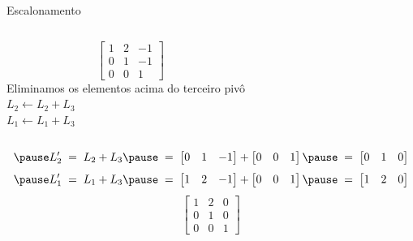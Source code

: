 \begin{resolution}{Escalonamento}
\begin{columns}
  \[\;\;\;
  \begin{bmatrix}
    1 & 2 & -1 \\
    0 & 1 & -1 \\
    0 & 0 & 1
  \end{bmatrix}
  \]
  \pause
{}
  Eliminamos os elementos acima do terceiro pivô
  \\ \pause
  \(
    L_2 \leftarrow L_2 + L_3
  \)
  \\ \pause
  \(
    L_1 \leftarrow L_1 + L_3
  \)
\end{columns}
\vspace{-\baselineskip}
\[
  \pause
  L'_2
  \;=\;
  L_2 + L_3
  \pause
  \;=\;
  \begin{bmatrix}
    0 & 1 & -1
  \end{bmatrix}
  +
  \begin{bmatrix}
    0 & 0 & 1
  \end{bmatrix}
  \pause
  \;=\;
  \begin{bmatrix}
    0 & 1 & 0
  \end{bmatrix}
\]
\[
  \pause
  L'_1
  \;=\;
  L_1 + L_3
  \pause
  \;=\;
  \begin{bmatrix}
    1 & 2 & -1
  \end{bmatrix}
  +
  \begin{bmatrix}
    0 & 0 & 1
  \end{bmatrix}
  \pause
  \;=\;
  \begin{bmatrix}
    1 & 2 & 0
  \end{bmatrix}
\]
\pause
\[
  \begin{bmatrix}
    1 & 2 & 0 \\
    0 & 1 & 0 \\
    0 & 0 & 1
  \end{bmatrix}
\]
\end{resolution}

